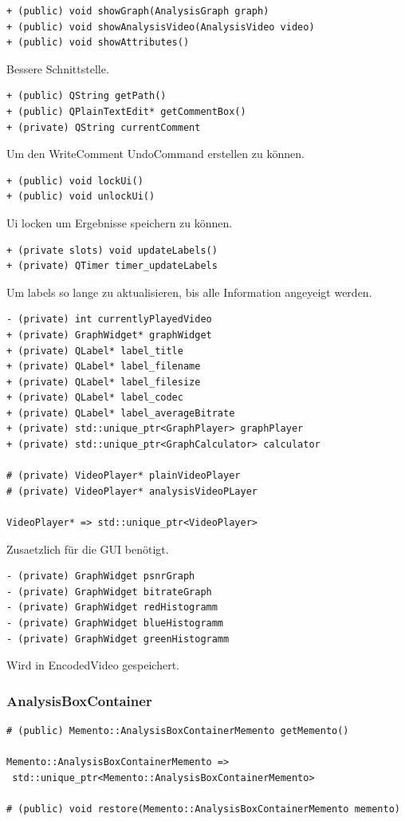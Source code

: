 \documentclass{scrartcl}
\begin{document}
{\begin{verbatim}
+ (public) void showGraph(AnalysisGraph graph)
+ (public) void showAnalysisVideo(AnalysisVideo video)
+ (public) void showAttributes()
\end{verbatim}
Bessere Schnittstelle.
\bigskip
\begin{verbatim}
+ (public) QString getPath()
+ (public) QPlainTextEdit* getCommentBox()
+ (private) QString currentComment
\end{verbatim}
Um den WriteComment UndoCommand erstellen zu können.
\bigskip
\begin{verbatim}
+ (public) void lockUi()
+ (public) void unlockUi()
\end{verbatim}
Ui locken um Ergebnisse speichern zu können.
\bigskip
\begin{verbatim}
+ (private slots) void updateLabels()
+ (private) QTimer timer_updateLabels
\end{verbatim}
Um labels so lange zu aktualisieren, bis alle Information angeyeigt werden.
\bigskip
\begin{verbatim}
- (private) int currentlyPlayedVideo
+ (private) GraphWidget* graphWidget
+ (private) QLabel* label_title
+ (private) QLabel* label_filename
+ (private) QLabel* label_filesize
+ (private) QLabel* label_codec
+ (private) QLabel* label_averageBitrate
+ (private) std::unique_ptr<GraphPlayer> graphPlayer
+ (private) std::unique_ptr<GraphCalculator> calculator

# (private) VideoPlayer* plainVideoPlayer
# (private) VideoPlayer* analysisVideoPLayer

VideoPlayer* => std::unique_ptr<VideoPlayer>
\end{verbatim}
Zusaetzlich für die GUI benötigt.
\bigskip
\begin{verbatim}
- (private) GraphWidget psnrGraph
- (private) GraphWidget bitrateGraph
- (private) GraphWidget redHistogramm
- (private) GraphWidget blueHistogramm
- (private) GraphWidget greenHistogramm
\end{verbatim}
Wird in EncodedVideo gespeichert.
\newpage
\subsubsection{AnalysisBoxContainer}
\bigskip
\begin{verbatim}
# (public) Memento::AnalysisBoxContainerMemento getMemento()

Memento::AnalysisBoxContainerMemento =>
 std::unique_ptr<Memento::AnalysisBoxContainerMemento>

# (public) void restore(Memento::AnalysisBoxContainerMemento memento)


\end{verbatim}}
\end{document}
